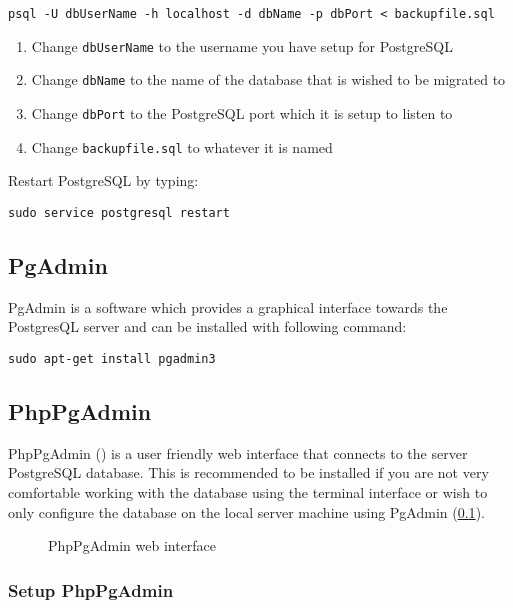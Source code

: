 \begin{verbatim}
psql -U dbUserName -h localhost -d dbName -p dbPort < backupfile.sql
\end{verbatim}
\begin{enumerate}
\item Change \verb+dbUserName+ to the username you have setup for PostgreSQL
\item Change \verb+dbName+ to the name of the database that is wished to be migrated to
\item Change \verb+dbPort+ to the PostgreSQL port which it is setup to listen to
\item Change \verb+backupfile.sql+ to whatever it is named
\end{enumerate}
Restart PostgreSQL by typing:
\begin{verbatim}
sudo service postgresql restart
\end{verbatim}




\subsection{PgAdmin}\label{pgadmin}
PgAdmin is a software which provides a graphical interface towards the PostgresQL server and can be installed with following command:
\begin{verbatim}
sudo apt-get install pgadmin3
\end{verbatim}





\subsection{PhpPgAdmin}
PhpPgAdmin () is a user friendly web interface that connects to the server PostgreSQL database. 
This is recommended to be installed if you are not very comfortable working with the database using the terminal 
interface or wish to only configure the database on the local server machine using PgAdmin (\ref{pgadmin}). 


\begin{figure}[htb]
\centering
{}
\caption{PhpPgAdmin web interface}
\label{fig:exp_phppgadminpic}
\end{figure}

\subsubsection{Setup PhpPgAdmin}

